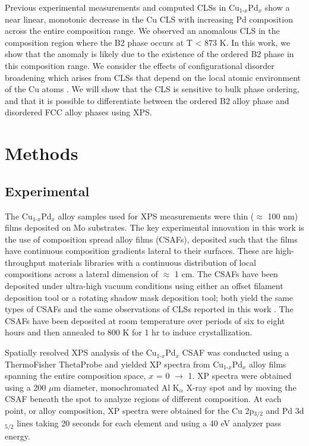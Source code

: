 \documentclass[number, sort&compress, review, 12pt]{elsarticle}
\begin{document}
Previous experimental measurements \cite{martensson-1981-elect-cu,cole-1997-deter-charg} and computed \cite{olovsson-2002-core-level} CLSs in Cu$_{\text{1-}x}$Pd$_x$ show a near linear, monotonic decrease in the Cu CLS with increasing Pd composition across the entire composition range. We observed an anomalous CLS in the composition region where the B2 phase occurs at T \textless{} 873 K. In this work, we show that the anomaly is likely due to the existence of the ordered B2 phase in this composition range. We consider the effects of configurational disorder broadening which arises from CLSs that depend on the local atomic environment of the Cu atoms \cite{marten-2005-ab-initio}. We will show that the CLS is sensitive to bulk phase ordering, and that it is possible to differentiate between the ordered B2 alloy phase and disordered FCC alloy phases using XPS.

\section{Methods}
\label{sec-2}
\subsection{Experimental}
\label{sec-2-1}
The Cu$_{\text{1-}x}$Pd$_x$ alloy samples used for XPS measurements were thin ($\approx$ 100 nm) films deposited on Mo substrates. The key experimental innovation in this work is the use of composition spread alloy films (CSAFs), deposited such that the films have continuous composition gradients lateral to their surfaces. These are high-throughput materials libraries with a continuous distribution of local compositions across a lateral dimension of $\approx$ 1 cm. The CSAFs have been deposited under ultra-high vacuum conditions using either an offset filament deposition tool or a rotating shadow mask deposition tool; both yield the same types of CSAFs and the same observations of CLSs reported in this work \cite{fleutot-2012-appar-depos,priyadarshini-2012-compac-tool}. The CSAFs have been deposited at room temperature over periods of six to eight hours and then annealed to 800 K for 1 hr to induce crystallization.

Spatially resolved XPS analysis of the Cu$_{\text{1-}x}$Pd$_x$ CSAF was conducted using a ThermoFisher ThetaProbe and yielded XP spectra from Cu$_{\text{1-}x}$Pd$_x$ alloy films spanning the entire composition space, $x$ = 0 $\rightarrow$ 1. XP spectra were obtained using a 200 $\mu$m diameter, monochromated Al K$_{\alpha}$ X-ray spot and by moving the CSAF beneath the spot to analyze regions of different composition. At each point, or alloy composition, XP spectra were obtained for the Cu 2p$_{\text{3/2}}$ and Pd 3d$_{\text{5/2}}$ lines taking 20 seconds for each element and using a 40 eV analyzer pass energy.
\end{document}
